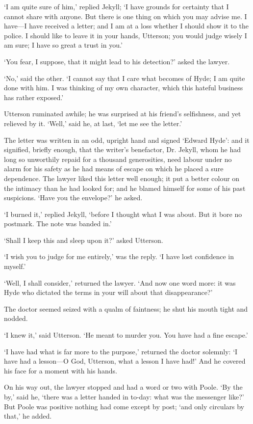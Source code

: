 \documentclass[]{novel}
\begin{document}
‘I am quite sure of him,’ replied Jekyll; ‘I have grounds for certainty that I cannot share with anyone. But there is one thing on which you may advise me. I have—I have received a letter; and I am at a loss whether I should show it to the police. I should like to leave it in your hands, Utterson; you would judge wisely I am sure; I have so great a trust in you.’

‘You fear, I suppose, that it might lead to his detection?’ asked the lawyer.

‘No,’ said the other. ‘I cannot say that I care what becomes of Hyde; I am quite done with him. I was thinking of my own character, which this hateful business has rather exposed.’

Utterson ruminated awhile; he was surprised at his friend’s selfishness, and yet relieved by it. ‘Well,’ said he, at last, ‘let me see the letter.’

The letter was written in an odd, upright hand and signed ‘Edward Hyde’: and it signified, briefly enough, that the writer’s benefactor, Dr. Jekyll, whom he had long so unworthily repaid for a thousand generosities, need labour under no alarm for his safety as he had means of escape on which he placed a sure dependence. The lawyer liked this letter well enough; it put a better colour on the intimacy than he had looked for; and he blamed himself for some of his past suspicions.
‘Have you the envelope?’ he asked.

‘I burned it,’ replied Jekyll, ‘before I thought what I was about. But it bore no postmark. The note was banded in.’

‘Shall I keep this and sleep upon it?’ asked Utterson.

‘I wish you to judge for me entirely,’ was the reply. ‘I have lost confidence in myself.’

‘Well, I shall consider,’ returned the lawyer. ‘And now one word more: it was Hyde who dictated the terms in your will about that disappearance?’

The doctor seemed seized with a qualm of faintness; he shut his mouth tight and nodded.

‘I knew it,’ said Utterson. ‘He meant to murder you. You have had a fine escape.’

‘I have had what is far more to the purpose,’ returned the doctor solemnly: ‘I have had a lesson—O God, Utterson, what a lesson I have had!’ And he covered his face for a moment with his hands.

On his way out, the lawyer stopped and had a word or two with Poole. ‘By the by,’ said he, ‘there was a letter handed in to-day: what was the messenger like?’ But Poole was positive nothing had come except by post; ‘and only circulars by that,’ he added.
\end{document}
